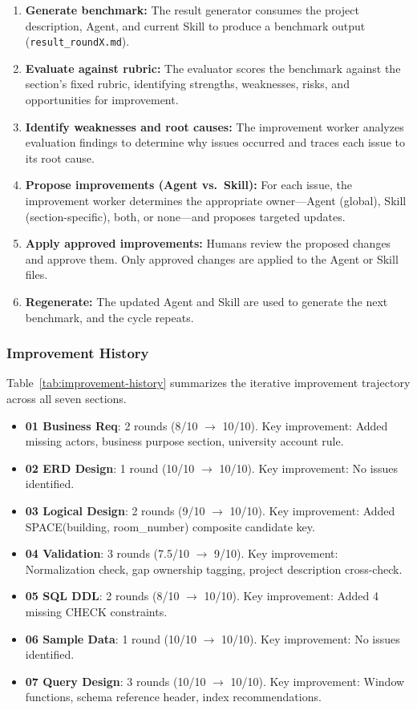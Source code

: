 \begin{enumerate}
    \item \textbf{Generate benchmark:} The result generator consumes the project description, Agent, and current Skill to produce a benchmark output (\texttt{result\_roundX.md}).
    \item \textbf{Evaluate against rubric:} The evaluator scores the benchmark against the section's fixed rubric, identifying strengths, weaknesses, risks, and opportunities for improvement.
    \item \textbf{Identify weaknesses and root causes:} The improvement worker analyzes evaluation findings to determine why issues occurred and traces each issue to its root cause.
    \item \textbf{Propose improvements (Agent vs.\ Skill):} For each issue, the improvement worker determines the appropriate owner---Agent (global), Skill (section-specific), both, or none---and proposes targeted updates.
    \item \textbf{Apply approved improvements:} Humans review the proposed changes and approve them. Only approved changes are applied to the Agent or Skill files.
    \item \textbf{Regenerate:} The updated Agent and Skill are used to generate the next benchmark, and the cycle repeats.
\end{enumerate}

\subsubsection{Improvement History}

Table~\ref{tab:improvement-history} summarizes the iterative improvement trajectory across all seven sections.

\begin{itemize}
    \item \textbf{01 Business Req}: 2 rounds (8/10 $\rightarrow$ 10/10). Key improvement: Added missing actors, business purpose section, university account rule.
    \item \textbf{02 ERD Design}: 1 round (10/10 $\rightarrow$ 10/10). Key improvement: No issues identified.
    \item \textbf{03 Logical Design}: 2 rounds (9/10 $\rightarrow$ 10/10). Key improvement: Added SPACE(building, room\_number) composite candidate key.
    \item \textbf{04 Validation}: 3 rounds (7.5/10 $\rightarrow$ 9/10). Key improvement: Normalization check, gap ownership tagging, project description cross-check.
    \item \textbf{05 SQL DDL}: 2 rounds (8/10 $\rightarrow$ 10/10). Key improvement: Added 4 missing CHECK constraints.
    \item \textbf{06 Sample Data}: 1 round (10/10 $\rightarrow$ 10/10). Key improvement: No issues identified.
    \item \textbf{07 Query Design}: 3 rounds (10/10 $\rightarrow$ 10/10). Key improvement: Window functions, schema reference header, index recommendations.
\end{itemize}

